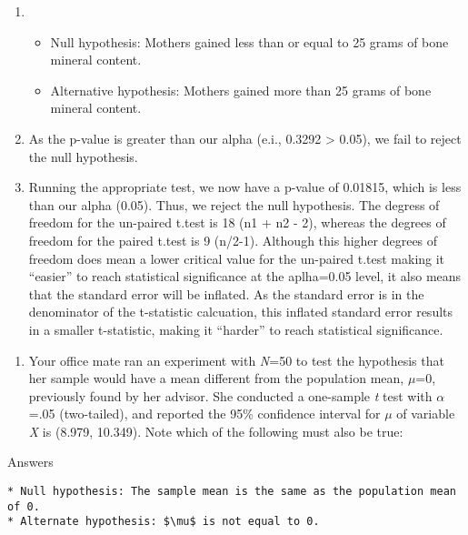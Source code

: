 \documentclass[]{article}
\providecommand{\tightlist}{%
  \setlength{\itemsep}{0pt}\setlength{\parskip}{0pt}}
\begin{document}
\begin{enumerate}
\def\labelenumi{\alph{enumi}.}
\item
  \begin{itemize}
  \tightlist
  \item
    Null hypothesis: Mothers gained less than or equal to 25 grams of
    bone mineral content.
  \item
    Alternative hypothesis: Mothers gained more than 25 grams of bone
    mineral content.
  \end{itemize}
\item
  As the p-value is greater than our alpha (e.i., 0.3292 \textgreater{}
  0.05), we fail to reject the null hypothesis.
\item
  Running the appropriate test, we now have a p-value of 0.01815, which
  is less than our alpha (0.05). Thus, we reject the null hypothesis.
  The degress of freedom for the un-paired t.test is 18 (n1 + n2 - 2),
  whereas the degrees of freedom for the paired t.test is 9 (n/2-1).
  Although this higher degrees of freedom does mean a lower critical
  value for the un-paired t.test making it ``easier'' to reach
  statistical significance at the aplha=0.05 level, it also means that
  the standard error will be inflated. As the standard error is in the
  denominator of the t-statistic calcuation, this inflated standard
  error results in a smaller t-statistic, making it ``harder'' to reach
  statistical significance.
\end{enumerate}

\begin{enumerate}
\def\labelenumi{\arabic{enumi}.}
\setcounter{enumi}{1}
\tightlist
\item
  Your office mate ran an experiment with \emph{N}=50 to test the
  hypothesis that her sample would have a mean different from the
  population mean, \(\mu\)=0, previously found by her advisor. She
  conducted a one-sample \emph{t} test with \(\alpha\)=.05 (two-tailed),
  and reported the 95\% confidence interval for \(\mu\) of variable
  \emph{X} is (8.979, 10.349). Note which of the following must also be
  true:
\end{enumerate}

Answers

\begin{verbatim}
* Null hypothesis: The sample mean is the same as the population mean of 0.
* Alternate hypothesis: $\mu$ is not equal to 0.
\end{verbatim}
\end{document}
